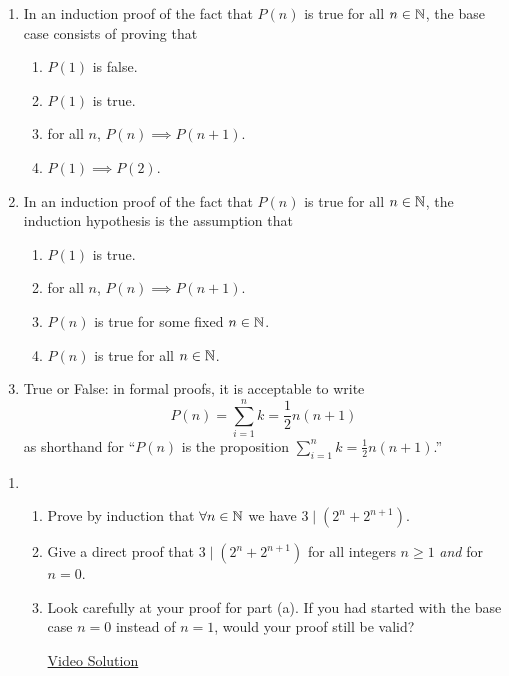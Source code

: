 \pagestyle{empty}


\begin{enumerate}
  \item In an induction proof of the fact that $P(n)$ is true for all $n \in \mathbb{N}$, the base case consists of proving that
	\begin{enumerate}
		\item $P(1)$ is false.
		\item $P(1)$ is true.
		\item for all $n$, $P(n) \implies P(n+1)$.
		\item $P(1) \implies P(2)$.
	\end{enumerate}
    
	\item In an induction proof of the fact that $P(n)$ is true for all $n \in \mathbb{N}$, the induction hypothesis is the assumption that
	\begin{enumerate}
		\item $P(1)$ is true.
		\item for all $n$, $P(n) \implies P(n+1)$.
		\item $P(n)$ is true for some fixed $n \in \mathbb{N}$.
		\item $P(n)$ is true for all $n \in \mathbb{N}$.
	\end{enumerate}
    
	\item True or False: in formal proofs, it is acceptable to write
  \[
		P(n)=\sum_{i=1}^n k=\frac{1}{2}n(n+1)
  \]
  as shorthand for ``$P(n)$ is the proposition $\sum_{i=1}^nk=\frac 12n(n+1)$.''
\end{enumerate}



\begin{enumerate}
	\item\begin{enumerate}
    \item Prove by induction that $\forall n\in\mathbb{N}$ we have $3\mid(2^n+2^{n+1})$.
    \item Give a direct proof that $3\mid(2^n+2^{n+1})$ for all integers $n\ge 1$ \emph{and} for $n=0$.
    \item Look carefully at your proof for part (a). If you had started with the base case $n=0$ instead of $n=1$, would your proof still be valid?
    
    \href{https://youtu.be/Z4qxw2YTLzI}{Video Solution}
  \end{enumerate}
\end{enumerate}

